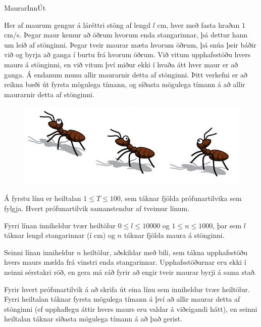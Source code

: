 \begin{problem}{Maurar}{Inn}{Út}{~}{~}

	Her af maurum gengur á láréttri stöng af lengd $l$ cm, hver með fasta hraðan $1$ cm/s. Þegar maur kemur að öðrum hvorum enda stangarinnar, þá dettur hann um leið af stönginni. Þegar tveir maurar mæta hvorum öðrum, þá snúa þeir báðir við og byrja að ganga í burtu frá hvorum öðrum. Við vitum upphafsstöðu hvers maurs á stönginni, en við vitum því miður ekki í hvaða átt hver maur er að ganga. Á endanum munu allir maurarnir detta af stönginni. Þitt verkefni er að reikna bæði út fyrsta mögulega tímann, og síðasta mögulega tímann á að allir maurarnir detta af stönginni.

	\begin{figure}[h]
		\centering
		\includegraphics[scale=0.3]{../Maurar/ants.jpg}
	\end{figure}

	\Input

		Á fyrstu línu er heiltalan $1 \leq T \leq 100$, sem táknar fjölda prófunartilvika sem fylgja. Hvert prófunartilvik samanstendur af tveimur línum.

		Fyrri línan inniheldur tvær heiltölur $0 \leq l \leq 10000$ og $1 \leq n \leq 1000$, þar sem $l$ táknar lengd stangarinnar (í cm) og $n$ táknar fjölda maura á stönginni.

		Seinni línan inniheldur $n$ heiltölur, aðskildar með bili, sem tákna upphafsstöðu hvers maurs mælda frá vinstri enda stangarinnar. Upphafsstöðurnar eru ekki í neinni sérstakri röð, en gera má ráð fyrir að engir tveir maurar byrji á sama stað.

	\Output

		Fyrir hvert prófunartilvik á að skrifa út eina línu sem inniheldur tvær heiltölur. Fyrri heiltalan táknar fyrsta mögulega tímann á því að allir maurar detta af stönginni (ef upphaflegu áttir hvers maurs eru valdar á viðeigandi hátt), en seinni heiltalan táknar síðasta mögulega tímann á að það gerist.

	\Examples

\begin{example}
%
\end{example}
\end{problem}